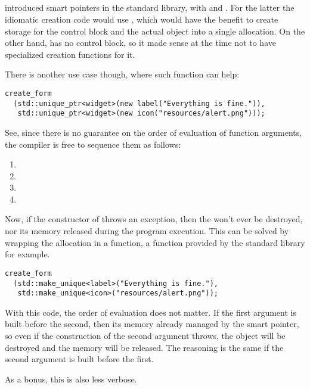 \subsection{}
%
%
%
 introduced smart pointers in the standard library, with
 and . For the latter
the idiomatic creation code would use , which
would have the benefit to create storage for the control block and the
actual object into a single allocation. On the other hand,
 has no control block, so it made sense at the
time not to have specialized creation functions for it.

There is another use case though, where such function can help:

\begin{lstlisting}
create_form
  (std::unique_ptr<widget>(new label("Everything is fine.")),
   std::unique_ptr<widget>(new icon("resources/alert.png")));
\end{lstlisting}

See, since there is no guarantee on the order of evaluation of
function arguments, the compiler is free to sequence them as follows:

\begin{enumerate}
\item {}
\item {}
\item {}
\item {}
\end{enumerate}

Now, if the constructor of  throws an exception, then the
 won't ever be destroyed, nor its memory released during
the program execution. This can be solved by wrapping the allocation
in a function, a function provided by the standard library for
example.

\begin{lstlisting}
create_form
  (std::make_unique<label>("Everything is fine."),
   std::make_unique<icon>("resources/alert.png"));
\end{lstlisting}

With this code, the order of evaluation does not matter. If the first
argument is built before the second, then its memory already managed
by the smart pointer, so even if the construction of the second
argument throws, the object will be destroyed and the memory will be
released. The reasoning is the same if the second argument is built
before the first.

As a bonus, this is also less verbose.
